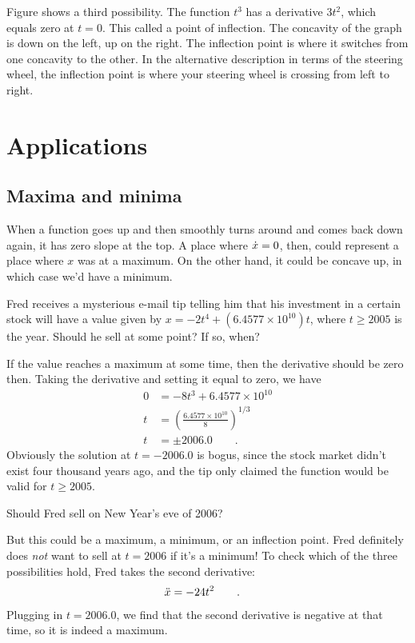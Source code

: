 
Figure  shows a third possibility. The function $t^3$ has a derivative $3t^2$, which equals
zero at $t=0$. This called a point of inflection. The concavity of the graph is down on the left, up on the right.
The inflection point is where it switches from one concavity to the other. In the alternative description in
terms of the steering wheel, the inflection point is where your steering wheel is crossing from left to right.\label{inflection}

\section{Applications}
\subsection{Maxima and minima}

When a function goes up and then smoothly turns around and comes back down again,
it has zero slope at the top. A place where $\dot{x}=0$, then, could represent
a place where $x$ was at a maximum. On the other hand, it could be concave up,
in which case we'd have a minimum.

\begin{eg}
\egquestion Fred receives a mysterious e-mail tip telling him that his investment in a certain stock will
have a value given by $x=-2t^4+(6.4577\times10^{10})t$, where $t\ge 2005$ is the year. Should he sell at some point? If so, when?

\eganswer If the value reaches a maximum at some time, then the derivative should be zero then. Taking the
derivative and setting it equal to zero, we have
\begin{align*}
  0 &= -8t^3+6.4577\times10^{10}\\
  t &= \left(\frac{6.4577\times10^{10}}{8}\right)^{1/3} \\
  t &= \pm 2006.0 \qquad .
\end{align*}
Obviously the solution at $t=-2006.0$ is bogus, since the stock market didn't exist four thousand years ago, and
the tip only claimed the function would be valid for $t\ge 2005$.

Should Fred sell on New Year's eve of 2006?

But this could be a maximum, a minimum, or an inflection point. Fred definitely does \emph{not} want to
sell at $t=2006$ if it's a minimum! To check which of the three possibilities hold, Fred takes the
second derivative:
\begin{align*}
 \Ddot{x} &= -24t^2 \qquad .
\end{align*}
Plugging in $t=2006.0$, we find that the second derivative is negative at that time, so it is indeed a
maximum.
\end{eg}

